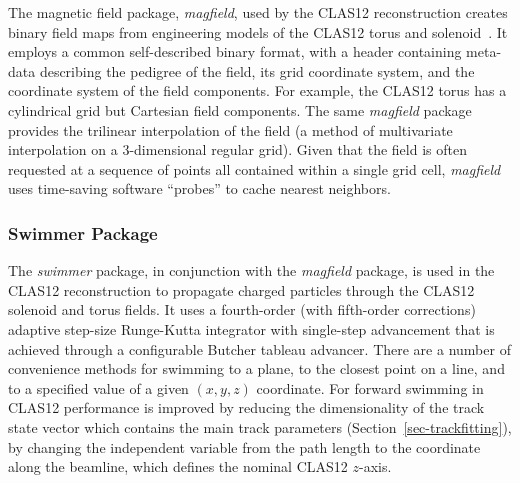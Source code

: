 The magnetic field package, {\it magfield}, used by the CLAS12 reconstruction creates binary field maps from
engineering models of the CLAS12 torus and solenoid~\cite{magnets-nim}. It employs a common self-described
binary format, with a header containing meta-data describing the pedigree of the field, its grid coordinate system,
and the coordinate system of the field components. For example, the CLAS12 torus has a cylindrical grid but
Cartesian field components. The same {\it magfield} package provides the trilinear interpolation of the field (a
method of multivariate interpolation on a 3-dimensional regular grid). Given that the field is often requested at a
sequence of points all contained within a single grid cell, {\it magfield} uses time-saving software “probes” to cache
nearest neighbors.

\subsubsection{Swimmer Package}

The {\it swimmer} package, in conjunction with the {\it magfield} package, is used in the CLAS12 reconstruction
to propagate charged particles through the CLAS12 solenoid and torus fields. It uses a fourth-order (with
fifth-order corrections) adaptive step-size Runge-Kutta integrator with single-step advancement that is achieved through
a configurable Butcher tableau advancer. There are a number of convenience methods for swimming to a plane, to
the closest point on a line, and to a specified value of a given $(x,y,z)$ coordinate. 
For forward swimming in CLAS12 performance is improved by reducing
the dimensionality of the track state vector which
contains the main track parameters (Section~\ref{sec-trackfitting}), by
changing the independent variable from the path length 
to the coordinate along the beamline, which defines the
nominal CLAS12 $z$-axis.
